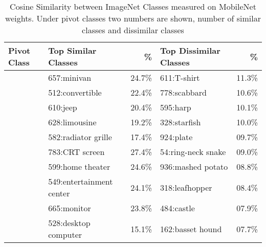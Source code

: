 \begin{table*}\caption{Cosine Similarity between ImageNet Classes measured on MobileNet weights. Under pivot classes two numbers are shown, number of similar classes and dissimilar classes}\label{table:cosine_classes}
\centering
\begin{tabularx}{\textwidth}{lXrXr}
\toprule
Pivot Class & Top Similar Classes & \% & Top Dissimilar Classes & \% \\
\midrule
{} & 657:minivan & 24.7\% & 611:T-shirt & 11.3\% \\
 & 512:convertible & 22.4\% & 778:scabbard & 10.6\% \\
 & 610:jeep & 20.4\% & 595:harp & 10.1\% \\
 & 628:limousine & 19.2\% & 328:starfish & 10.0\% \\
 & 582:radiator grille & 17.4\% & 924:plate & 09.7\% \\
\midrule
{} & 783:CRT screen & 27.4\% & 54:ring-neck snake & 09.0\% \\
 & 599:home theater & 24.6\% & 936:mashed potato & 08.8\% \\
 & 549:entertainment center & 24.1\% & 318:leafhopper & 08.4\% \\
 & 665:monitor & 23.8\% & 484:castle & 07.9\% \\
 & 528:desktop computer & 15.1\% & 162:basset hound & 07.7\% \\
\midrule

\end{tabularx}
\end{table*}

